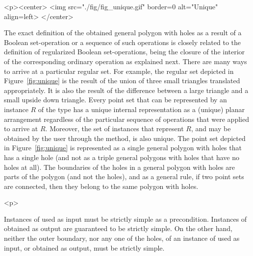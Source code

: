 \lcHtml{\label{fig:unique}}
\begin{ccHtmlOnly}
  <p><center>
    <img src="./fig/fig_unique.gif" border=0 alt="Unique" align=left>
  </center>
\end{ccHtmlOnly}
The exact definition of the obtained general polygon with holes as a
result of a Boolean set-operation or a sequence of such operations is
closely related to the definition of regularized Boolean 
set-operations, being the closure of the interior of the corresponding
ordinary operation as explained next.
There are many ways to arrive at a particular regular set. For
example, the regular set depicted in Figure~\ref{fig:unique} is the
result of the union of three small triangles translated
appropriately. It is also the result of the difference between a large
triangle and a small upside down triangle. Every point set that can be
represented by an instance $R$ of the  type
has a unique internal representation as a (unique) planar arrangement
regardless of the particular sequence of operations that were applied
to arrive at $R$. Moreover, the set of
 instances that represent $R$, and
may be obtained by the user through the
 method, is also unique. The point
set depicted in Figure~\ref{fig:unique} is represented as a single
general polygon with holes that has a single hole (and not as a triple
general polygons with holes that have no holes at all). The boundaries
of the holes in a general polygon with holes are parts of the polygon
(and not the holes), and as a general rule, if two point sets are
connected, then they belong to the same polygon with holes.
 
\begin{ccHtmlOnly}<p>\end{ccHtmlOnly}
Instances of  used as input must be strictly simple
as a precondition. Instances of  obtained as output
are guaranteed to be strictly simple. On the other hand, neither the outer
boundary, nor any one of the holes, of an instance of
 used as input, or obtained as output,
must be strictly simple.

